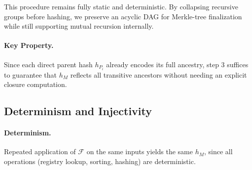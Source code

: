 \documentclass[sigplan,screen]{acmart}
\begin{document}
This procedure remains fully static and deterministic. By collapsing recursive groups before hashing, we preserve an acyclic DAG for Merkle-tree finalization while still supporting mutual recursion internally.

\paragraph{Key Property.} 
Since each direct parent hash $h_{P_i}$ already encodes its full ancestry, step 3 suffices to guarantee that $h_M$ reflects all transitive ancestors without needing an explicit closure computation.

\subsection{Determinism and Injectivity}
\paragraph{Determinism.} 
Repeated application of $\mathcal{F}$ on the same inputs yields the same $h_M$, since all operations (registry lookup, sorting, hashing) are deterministic.
\end{document}
